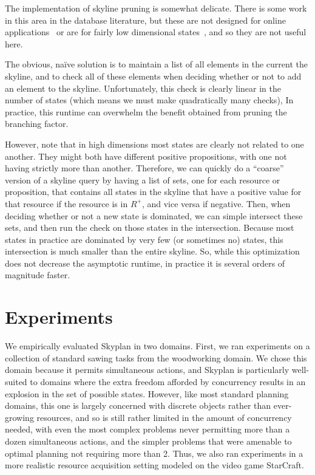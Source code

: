 \documentclass[letterpaper]{article}
\theoremstyle{plain} \newtheorem{theorem}{Theorem} \newtheorem{proposition}{Proposition} \newtheorem{lemma}{Lemma}
\theoremstyle{definition} \newtheorem{definition}{Definition} \newtheorem{conjecture}{Conjecture} \newtheorem*{example}{Example}
\theoremstyle{remark} \newtheorem*{remark}{Remark} \newtheorem*{note}{Note} \newtheorem{case}{Case}
\begin{document}
The implementation of skyline pruning is somewhat delicate.  There
is some work in this area in the database literature, but these are
not designed for online applications~\citep{skylineoperator,tan01efficient}
or are for fairly low dimensional states~\citep{KossmannRR02}, and
so they are not useful here.

The obvious, na\"ive solution is to maintain a list of all elements
in the current the skyline, and to check all of these elements when
deciding whether or not to add an element to the skyline. Unfortunately,
this check is clearly linear in the number of states (which means
we must make quadratically many checks), In practice, this
runtime can overwhelm the benefit obtained from pruning the branching factor.

However, note that in high dimensions most states are clearly not
related to one another.  They might both have different positive
propositions, with one not having strictly more than another.
Therefore, we can quickly do a ``coarse'' version of a skyline query
by having a list of sets, one for each resource or proposition,
that contains all states in the skyline that have a positive value
for that resource if the resource is in $R^+$, and
vice versa if negative. Then, when deciding whether or not a new
state is dominated, we can simple intersect these sets, and then
run the check on those states in the intersection. Because most
states in practice are dominated by very few (or sometimes no)
states, this intersection is much smaller than the entire skyline.
So, while this optimization does not decrease the asymptotic runtime,
in practice it is several orders of magnitude faster.



\section{Experiments}

We empirically evaluated Skyplan in two domains. First, we ran experiments on a collection
of standard sawing tasks from the woodworking domain. We chose this domain because it
permits simultaneous actions, and Skyplan is particularly well-suited to domains where the
extra freedom afforded by concurrency results in an explosion in the set of possible
states. However, like most standard planning domains, this one is largely concerned with
discrete objects rather than ever-growing resources, and so is still rather limited in the
amount of concurrency needed, with even the most complex problems never permitting more
than a dozen simultaneous actions, and the simpler problems that were amenable to optimal
planning not requiring more than 2. Thus, we also ran experiments in a more realistic
resource acquisition setting modeled on the video game StarCraft.
\end{document}
